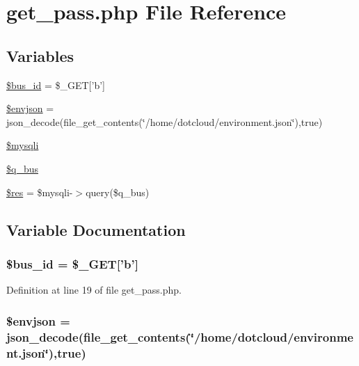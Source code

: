 \hypertarget{get__pass_8php}{
\section{get\_\-pass.php File Reference}
\label{get__pass_8php}
}
\subsection*{Variables}
\begin{DoxyCompactItemize}
\item 
\hyperlink{get__pass_8php_a4cad772a42203b0ff8351e1a060df14d_a4cad772a42203b0ff8351e1a060df14d}{\$bus\_\-id} = \$\_\-GET\mbox{[}'b'\mbox{]}
\item 
\hyperlink{get__pass_8php_a22377fbdee6b0aad7e6e4b043f2b6603_a22377fbdee6b0aad7e6e4b043f2b6603}{\$envjson} = json\_\-decode(file\_\-get\_\-contents(\char`\"{}/home/dotcloud/environment.json\char`\"{}),true)
\item 
\hyperlink{get__pass_8php_a580989e8e3521433691a0351287f6315_a580989e8e3521433691a0351287f6315}{\$mysqli}
\item 
\hyperlink{get__pass_8php_a531a3cdb9017f75f6acb74a688f1ceeb_a531a3cdb9017f75f6acb74a688f1ceeb}{\$q\_\-bus}
\item 
\hyperlink{get__pass_8php_a49a8a4009b02e49717caa88b128affc5_a49a8a4009b02e49717caa88b128affc5}{\$res} = \$mysqli-\/$>$query(\$q\_\-bus)
\end{DoxyCompactItemize}


\subsection{Variable Documentation}
\hypertarget{get__pass_8php_a4cad772a42203b0ff8351e1a060df14d_a4cad772a42203b0ff8351e1a060df14d}{
\subsubsection[{\$bus\_\-id}]{\setlength{\rightskip}{0pt plus 5cm}\$bus\_\-id = \$\_\-GET\mbox{[}'b'\mbox{]}}}
\label{get__pass_8php_a4cad772a42203b0ff8351e1a060df14d_a4cad772a42203b0ff8351e1a060df14d}


Definition at line 19 of file get\_\-pass.php.

\hypertarget{get__pass_8php_a22377fbdee6b0aad7e6e4b043f2b6603_a22377fbdee6b0aad7e6e4b043f2b6603}{
\subsubsection[{\$envjson}]{\setlength{\rightskip}{0pt plus 5cm}\$envjson = json\_\-decode(file\_\-get\_\-contents(\char`\"{}/home/dotcloud/environment.json\char`\"{}),true)}}
\label{get__pass_8php_a22377fbdee6b0aad7e6e4b043f2b6603_a22377fbdee6b0aad7e6e4b043f2b6603}


